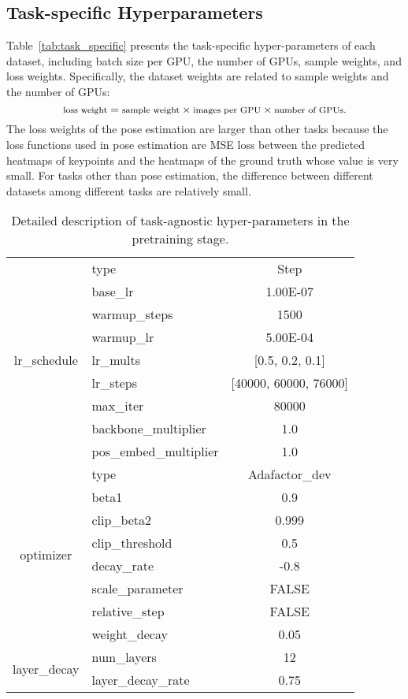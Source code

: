 \documentclass[10pt,twocolumn,letterpaper]{article}
\begin{document}
\subsection{Task-specific Hyperparameters}
Table~\ref{tab:task_specific} presents the task-specific hyper-parameters of each dataset, including batch size per GPU, the number of GPUs, sample weights, and loss weights. Specifically, the dataset weights are related to sample weights and the number of GPUs:
\begin{equation}
\footnotesize
    \text{loss weight} = \text{sample weight} \times \text{images per GPU} \times \text{number of GPUs}.
\end{equation}
The loss weights of the pose estimation are larger than other tasks because the loss functions used in pose estimation are MSE loss between the predicted heatmaps of keypoints and the heatmaps of the ground truth whose value is very small. For tasks other than pose estimation, the difference between different datasets among different tasks are relatively small.  








\begin{table}[t]
  \centering
  \small
  \caption{Detailed description of task-agnostic hyper-parameters in the pretraining stage.}
    \begin{tabular}{clc}
    \hline
    \multirow{9}[2]{*}{lr\_schedule} & type  & Step \\
          & base\_lr & 1.00E-07 \\
          & warmup\_steps & 1500 \\
          & warmup\_lr & 5.00E-04 \\
          & lr\_mults & [0.5, 0.2, 0.1] \\
          & lr\_steps & [40000, 60000, 76000] \\
          & max\_iter & 80000 \\
          & backbone\_multiplier & 1.0 \\
          & pos\_embed\_multiplier & 1.0 \\
    \midrule
    \multirow{8}[2]{*}{optimizer} & type  & Adafactor\_dev \\
          & beta1 & 0.9 \\
          & clip\_beta2 & 0.999 \\
          & clip\_threshold & 0.5 \\
          & decay\_rate & -0.8 \\
          & scale\_parameter & FALSE \\
          & relative\_step & FALSE \\
          & weight\_decay & 0.05 \\
    \midrule
    \multirow{2}[2]{*}{layer\_decay} & num\_layers & 12 \\
          & layer\_decay\_rate & 0.75 \\
    \bottomrule
    \end{tabular}\label{tab:task_agnostic_pretraining}\end{table}
\end{document}
